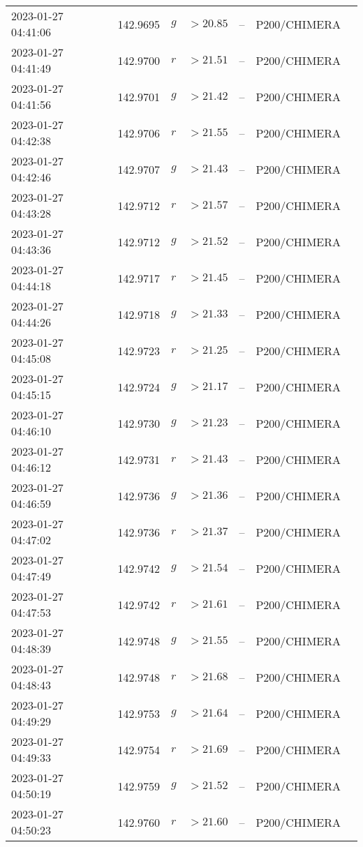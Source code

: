 \documentclass{nature_plusfigure}
\begin{document}
\begin{supplement}
\begin{center}
\begin{longtable}{lllllll}
2023-01-27 04:41:06 & 142.9695 & $g$ & $>20.85$ & -- & P200/CHIMERA &  \\ 
2023-01-27 04:41:49 & 142.9700 & $r$ & $>21.51$ & -- & P200/CHIMERA &  \\ 
2023-01-27 04:41:56 & 142.9701 & $g$ & $>21.42$ & -- & P200/CHIMERA &  \\ 
2023-01-27 04:42:38 & 142.9706 & $r$ & $>21.55$ & -- & P200/CHIMERA &  \\ 
2023-01-27 04:42:46 & 142.9707 & $g$ & $>21.43$ & -- & P200/CHIMERA &  \\ 
2023-01-27 04:43:28 & 142.9712 & $r$ & $>21.57$ & -- & P200/CHIMERA &  \\ 
2023-01-27 04:43:36 & 142.9712 & $g$ & $>21.52$ & -- & P200/CHIMERA &  \\ 
2023-01-27 04:44:18 & 142.9717 & $r$ & $>21.45$ & -- & P200/CHIMERA &  \\ 
2023-01-27 04:44:26 & 142.9718 & $g$ & $>21.33$ & -- & P200/CHIMERA &  \\ 
2023-01-27 04:45:08 & 142.9723 & $r$ & $>21.25$ & -- & P200/CHIMERA &  \\ 
2023-01-27 04:45:15 & 142.9724 & $g$ & $>21.17$ & -- & P200/CHIMERA &  \\ 
2023-01-27 04:46:10 & 142.9730 & $g$ & $>21.23$ & -- & P200/CHIMERA &  \\ 
2023-01-27 04:46:12 & 142.9731 & $r$ & $>21.43$ & -- & P200/CHIMERA &  \\ 
2023-01-27 04:46:59 & 142.9736 & $g$ & $>21.36$ & -- & P200/CHIMERA &  \\ 
2023-01-27 04:47:02 & 142.9736 & $r$ & $>21.37$ & -- & P200/CHIMERA &  \\ 
2023-01-27 04:47:49 & 142.9742 & $g$ & $>21.54$ & -- & P200/CHIMERA &  \\ 
2023-01-27 04:47:53 & 142.9742 & $r$ & $>21.61$ & -- & P200/CHIMERA &  \\ 
2023-01-27 04:48:39 & 142.9748 & $g$ & $>21.55$ & -- & P200/CHIMERA &  \\ 
2023-01-27 04:48:43 & 142.9748 & $r$ & $>21.68$ & -- & P200/CHIMERA &  \\ 
2023-01-27 04:49:29 & 142.9753 & $g$ & $>21.64$ & -- & P200/CHIMERA &  \\ 
2023-01-27 04:49:33 & 142.9754 & $r$ & $>21.69$ & -- & P200/CHIMERA &  \\ 
2023-01-27 04:50:19 & 142.9759 & $g$ & $>21.52$ & -- & P200/CHIMERA &  \\ 
2023-01-27 04:50:23 & 142.9760 & $r$ & $>21.60$ & -- & P200/CHIMERA &  \\ 

\end{longtable}
\end{center}
\end{supplement}
\end{document}
